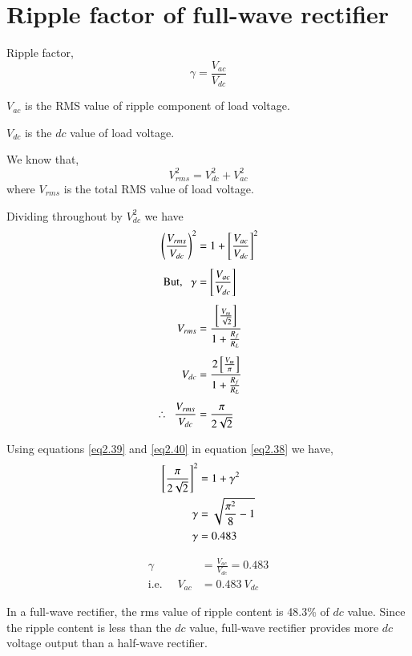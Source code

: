 \section{Ripple factor of full-wave rectifier}\label{eq2.13}

Ripple factor,
\begin{equation}
\gamma = \frac{V_{ac}}{V_{dc}} \label{eq2.37}
\end{equation}

$V_{ac}$ is the RMS value of ripple component of load voltage.

$V_{dc}$ is the $dc$ value of load voltage.

We know that,
$$
V^2_{rms} = V^2_{dc} + V^2_{ac} 
$$
where $V_{rms}$ is the total RMS value of load voltage.

Dividing throughout by $V^2_{dc}$ we have
\begin{align}
\left(\frac{V_{rms}}{V_{dc}} \right)^2 & = 1 +
\left[\frac{V_{ac}}{V_{dc}} \right]^2 \label{eq2.38}\\[4pt]
\text{But, }~~ \gamma & = \left[\frac{V_{ac}}{V_{dc}}
  \right] \label{eq2.39}\\[4pt]
V_{rms} &= \frac{\left[ \frac{V_m}{\sqrt{2}} \right]}{1 +
    \frac{R_f}{R_L}} \notag\\[4pt]
V_{dc} & = \frac{2 \left[\frac{V_m}{\pi} \right]}{1+
  \frac{R_f}{R_L}} \notag\\[4pt]
\therefore~~  \frac{V_{rms}}{V_{dc}} & = \frac{\pi}{2 \sqrt{2}} \label{eq2.40}
\end{align}

\eject

Using equations \eqref{eq2.39} and \eqref{eq2.40} in equation
\eqref{eq2.38} we have,
\begin{align}
\left[\frac{\pi}{2 \sqrt{2}} \right]^2 & = 1 + \gamma^2 \notag\\
\gamma & = \sqrt{\frac{\pi^2}{8} -1} \notag \\
\gamma & = 0.483 \label{eq2.41}
\end{align}

\medskip
{}
\begin{align*}
\gamma & = \frac{V_{ac}}{V_{dc}} = 0.483\\
\text{i.e. } \quad V_{ac} & = 0.483 ~ V_{dc}
\end{align*}

In a full-wave rectifier, the rms value of ripple content is 48.3\% of
$dc$ value. Since the ripple content is less than the $dc$ value,
full-wave rectifier provides more $dc$ voltage output than a half-wave
rectifier.

